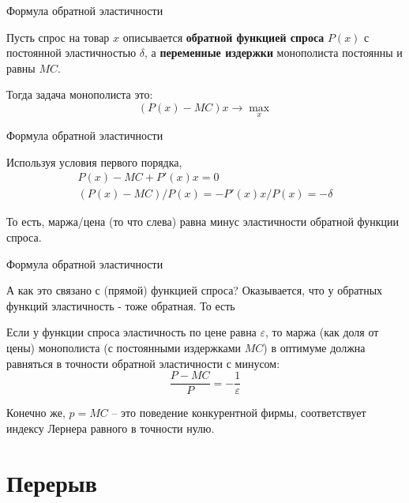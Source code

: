 \documentclass{beamer}
\begin{document}
\begin{frame}{Формула обратной эластичности}

Пусть спрос на товар $x$ описывается \textbf{обратной функцией спроса} $P(x)$ с постоянной эластичностью $\delta$, а \textbf{переменные издержки} монополиста постоянны и равны $MC$. 

Тогда задача монополиста это:
$$ (P(x) - MC)x \to \max_x$$

\end{frame}

\begin{frame}{Формула обратной эластичности}

Используя условия первого порядка,
\begin{gather*}
P(x) - MC + P'(x)x = 0\\
(P(x) - MC)/P(x) = - P'(x)x/P(x) = - \delta
\end{gather*}


То есть, маржа/цена (то что слева) равна минус эластичности обратной функции спроса.
\end{frame}

\begin{frame}{Формула обратной эластичности}

А как это связано с (прямой) функцией спроса? Оказывается, что у обратных функций эластичность - тоже обратная. То есть 

\begin{lemma}
Если у функции спроса эластичность по цене равна $\varepsilon$, то маржа (как доля от цены) монополиста (с постоянными издержками $MC$) в оптимуме должна равняться в точности обратной эластичности с минусом:
$$\frac{P-MC}{P} = - \frac{1}{\varepsilon}$$
\end{lemma}
Конечно же, $p=MC$ – это поведение конкурентной фирмы, соответствует индексу Лернера равного в точности нулю.
\end{frame}

\section{Перерыв}
\end{document}
